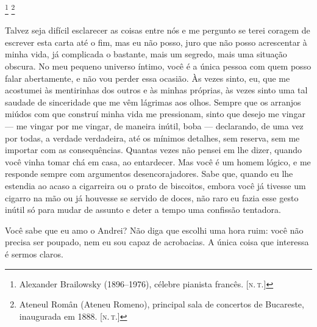 \footnote{Alexander Brailowsky
  (1896--1976), célebre pianista francês. {[}\textsc{n.\,t.}{]}} \footnote{Ateneul Român (Ateneu Romeno), principal sala de
  concertos de Bucareste, inaugurada em 1888. {[}\textsc{n.\,t.}{]}} 

Talvez seja difícil esclarecer as coisas entre nós e me pergunto se
terei coragem de escrever esta carta até o fim, mas eu não posso, juro
que não posso acrescentar à minha vida, já complicada o bastante, mais
um segredo, mais uma situação obscura. No meu pequeno universo íntimo,
você é a única pessoa com quem posso falar abertamente, e não vou perder
essa ocasião. Às vezes sinto, eu, que me acostumei às mentirinhas dos
outros e às minhas próprias, às vezes sinto uma tal saudade de
sinceridade que me vêm lágrimas aos olhos. Sempre que os arranjos miúdos
com que construí minha vida me pressionam, sinto que desejo me vingar
--- me vingar por me vingar, de maneira inútil, boba --- declarando, de
uma vez por todas, a verdade verdadeira, até os mínimos detalhes, sem
reserva, sem me importar com as consequências. Quantas vezes não pensei
em lhe dizer, quando você vinha tomar chá em casa, ao entardecer. Mas
você é um homem lógico, e me responde sempre com argumentos
desencorajadores. Sabe que, quando eu lhe estendia ao acaso a cigarreira
ou o prato de biscoitos, embora você já tivesse um cigarro na mão ou já
houvesse se servido de doces, não raro eu fazia esse gesto inútil só
para mudar de assunto e deter a tempo uma confissão tentadora.


Você sabe que eu amo o Andrei? Não diga que escolhi uma hora ruim: você
não precisa ser poupado, nem eu sou capaz de acrobacias. A única coisa
que interessa é sermos claros.

